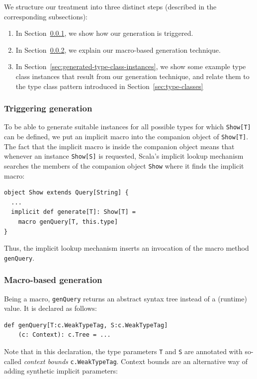 \documentclass[preprint]{sigplanconf}
\begin{document}
We structure our treatment into three distinct steps (described in the
corresponding subsections):

\begin{enumerate}
\item In Section~\ref{sec:triggering-generation}, we show how our generation is
      triggered.

\item In Section~\ref{sec:macro-based-generation}, we explain our macro-based
      generation technique.

\item In Section~\ref{sec:generated-type-class-instances}, we show some example
      type class instances that result from our generation technique, and relate
      them to the type class pattern introduced in Section~\ref{sec:type-classes}
\end{enumerate}

\subsubsection{Triggering generation}
\label{sec:triggering-generation}

To be able to generate suitable instances for all possible types for which
\verb|Show[T]| can be defined, we put an implicit macro into the companion
object of \verb|Show[T]|. The fact that the implicit macro is inside the
companion object means that whenever an instance \verb|Show[S]| is requested,
Scala's implicit lookup mechanism searches the members of the companion object
\verb|Show| where it finds the implicit macro:

\begin{lstlisting}
object Show extends Query[String] {
  ...
  implicit def generate[T]: Show[T] =
    macro genQuery[T, this.type]
}
\end{lstlisting}
\noindent
Thus, the implicit lookup mechanism inserts an invocation of the macro method
\verb|genQuery|.

\subsubsection{Macro-based generation}
\label{sec:macro-based-generation}

Being a macro, \verb|genQuery| returns an abstract syntax
tree instead of a (runtime) value. It is declared as follows:

\begin{lstlisting}
def genQuery[T:c.WeakTypeTag, S:c.WeakTypeTag]
    (c: Context): c.Tree = ...
\end{lstlisting}
\noindent
Note that in this declaration, the type parameters \verb|T| and \verb|S| are annotated with
so-called \emph{context bounds} \verb|c.WeakTypeTag|. Context bounds are an
alternative way of adding synthetic implicit parameters:
\end{document}
